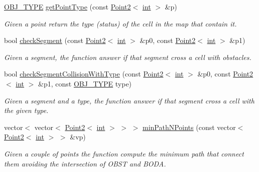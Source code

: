 \begin{DoxyCompactItemize}
\mbox{\hyperlink{map_8hh_a714b9c2c276fbae637fee36453d9121e}{O\+B\+J\+\_\+\+T\+Y\+PE}} \mbox{\hyperlink{class_mapp_ac6341641bd67502eef7c025cb4cd1c71}{get\+Point\+Type}} (const \mbox{\hyperlink{class_point2}{Point2}}$<$ \mbox{\hyperlink{draw_8hh_aa620a13339ac3a1177c86edc549fda9b}{int}} $>$ \&p)
\begin{DoxyCompactList}\small\item\em Given a point return the type (status) of the cell in the map that contain it. \end{DoxyCompactList}\item 
bool \mbox{\hyperlink{class_mapp_ade6135be96d93778352a7a313793adf3}{check\+Segment}} (const \mbox{\hyperlink{class_point2}{Point2}}$<$ \mbox{\hyperlink{draw_8hh_aa620a13339ac3a1177c86edc549fda9b}{int}} $>$ \&p0, const \mbox{\hyperlink{class_point2}{Point2}}$<$ \mbox{\hyperlink{draw_8hh_aa620a13339ac3a1177c86edc549fda9b}{int}} $>$ \&p1)
\begin{DoxyCompactList}\small\item\em Given a segment, the function answer if that segment cross a cell with obstacles. \end{DoxyCompactList}\item 
bool \mbox{\hyperlink{class_mapp_a8c48e05ec516f82efa0b1b7febe41292}{check\+Segment\+Collision\+With\+Type}} (const \mbox{\hyperlink{class_point2}{Point2}}$<$ \mbox{\hyperlink{draw_8hh_aa620a13339ac3a1177c86edc549fda9b}{int}} $>$ \&p0, const \mbox{\hyperlink{class_point2}{Point2}}$<$ \mbox{\hyperlink{draw_8hh_aa620a13339ac3a1177c86edc549fda9b}{int}} $>$ \&p1, const \mbox{\hyperlink{map_8hh_a714b9c2c276fbae637fee36453d9121e}{O\+B\+J\+\_\+\+T\+Y\+PE}} type)
\begin{DoxyCompactList}\small\item\em Given a segment and a type, the function answer if that segment cross a cell with the given type. \end{DoxyCompactList}\item 
vector$<$ vector$<$ \mbox{\hyperlink{class_point2}{Point2}}$<$ \mbox{\hyperlink{draw_8hh_aa620a13339ac3a1177c86edc549fda9b}{int}} $>$ $>$ $>$ \mbox{\hyperlink{class_mapp_a35ab624c5ab00d577580f132238147d8}{min\+Path\+N\+Points}} (const vector$<$ \mbox{\hyperlink{class_point2}{Point2}}$<$ \mbox{\hyperlink{draw_8hh_aa620a13339ac3a1177c86edc549fda9b}{int}} $>$ $>$ \&vp)
\begin{DoxyCompactList}\small\item\em Given a couple of points the function compute the minimum path that connect them avoiding the intersection of O\+B\+ST and B\+O\+DA. \end{DoxyCompactList}\item 

\end{DoxyCompactItemize}
